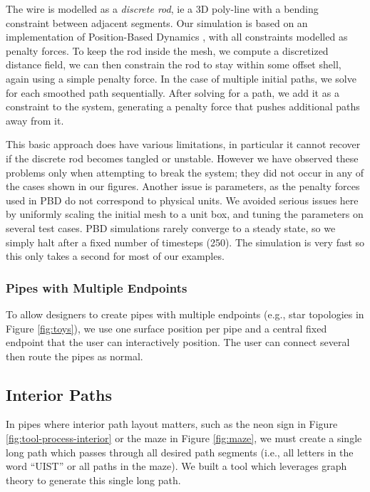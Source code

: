 The wire is modelled as a \emph{discrete rod}, ie a 3D poly-line with a bending 
constraint between adjacent segments. Our simulation is based on an
implementation of Position-Based Dynamics \cite{Muller07}, with all constraints
modelled as penalty forces. To keep the rod inside the
mesh, we compute a discretized distance field, we can then constrain the
rod to stay within some offset shell, again using a simple penalty force.
In the case of multiple initial paths, we solve for each smoothed path sequentially.
After solving for a path, we add it as a constraint to the system, generating
a penalty force that pushes additional paths away from it.

This basic approach does have various limitations, in particular it
cannot recover if the discrete rod becomes tangled or unstable. 
However we have observed these problems only when attempting to break
the system; they did not occur in any of the cases shown in our figures.
Another issue is parameters, as the penalty forces used in PBD do not
correspond to physical units. We avoided serious issues here by uniformly
scaling the initial mesh to a unit box, and tuning the parameters on several test cases.
PBD simulations rarely converge to a steady state, 
so we simply halt after a fixed number of timesteps (250). 
The simulation is very fast so this only takes a second for most of our examples.


\subsubsection{Pipes with Multiple Endpoints}
To allow designers to create pipes with multiple endpoints (e.g., star topologies in Figure \ref{fig:toys}), we use one surface position per pipe and a central fixed endpoint that the user can interactively position.  The user can connect several  then route the pipes as normal.

\subsection{Interior Paths}

In pipes where interior path layout matters, such as the neon sign in Figure \ref{fig:tool-process-interior} or the maze in Figure \ref{fig:maze}, we must create a single long path which passes through all desired path segments (i.e., all letters in the word ``UIST'' or all paths in the maze).  We built a tool which leverages graph theory to generate this single long path.

